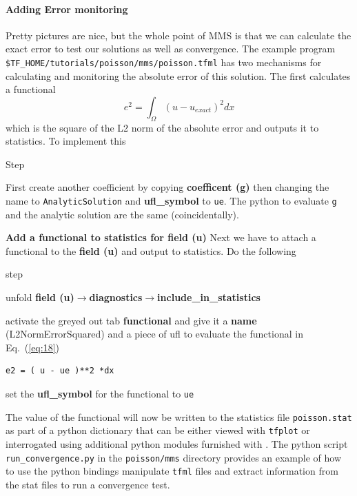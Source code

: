 \paragraph{Adding Error monitoring}
\label{sec:adding-error-monit}

Pretty pictures are nice,  but the whole point of MMS is that we can calculate the exact error to test our solutions as well as convergence.  The example program \texttt{\$TF\_HOME/tutorials/poisson/mms/poisson.tfml} has two mechanisms for calculating and monitoring the absolute error of this solution.  The first calculates a functional
\begin{equation}
  \label{eq:18}
  e^{2} = \int_{\Omega} (u-u_{exact})^{2} dx
\end{equation}
which is the square of the L2 norm of the absolute error and outputs it to statistics.  To implement this
\begin{steps}{Step}
\item First create another coefficient by copying \textbf{coefficent (g)} then changing the name to \texttt{AnalyticSolution} and \textbf{ufl\_symbol} to \texttt{ue}.  The python to evaluate \texttt{g} and the analytic solution are the same (coincidentally).
\item \textbf{Add a functional to statistics for field (u)} Next we have to attach a functional to the \textbf{field (u)} and output to statistics.  Do the following
  \begin{steps}{step}
  \item unfold \textbf{field (u)}$\rightarrow$\textbf{diagnostics}$\rightarrow$\textbf{include\_in\_statistics}
  \item activate the greyed out tab \textbf{functional} and give it a \textbf{name} (L2NormErrorSquared) and a piece of ufl to evaluate the functional in Eq.\ (\ref{eq:18})
    \begin{lstlisting}[style=UFL]
e2 = ( u - ue )**2 *dx
    \end{lstlisting}
  \item set the  \textbf{ufl\_symbol} for the functional to \texttt{ue}
  \end{steps}
\end{steps}
The value of the functional will now be written to the statistics file \texttt{poisson.stat} as part of a python dictionary that can be either viewed with \texttt{tfplot} or interrogated using additional python modules furnished with \TF{}. The python script \texttt{run\_convergence.py} in the \texttt{poisson/mms} directory provides an example of how to use the python bindings  manipulate \texttt{tfml} files and extract information from the stat files to run a convergence test.
